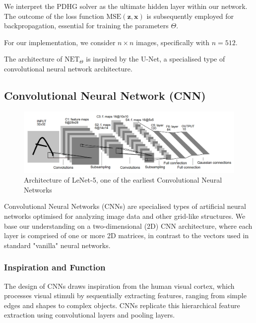\documentclass[12pt]{article}
\begin{document}
We interpret the PDHG solver as the ultimate hidden layer within our network. The outcome of the loss function $\text{MSE}(\mathbf{z}, \mathbf{x})$ is subsequently employed for backpropagation, essential for training the parameters $\Theta$.

For our implementation, we consider $n \times n$ images, specifically with $n = 512$.



The architecture of $\text{NET}_{\Theta}$ is inspired by the U-Net, a specialised type of convolutional neural network architecture.




\subsection{
Convolutional Neural Network (CNN) 
}

\begin{figure}[ht]
    \includegraphics[width=1\linewidth]{Le-Net 5.png}
    
    \caption{Architecture of LeNet-5, one of the earliest Convolutional Neural Networks \cite{726791}} 
    \label{fig:enter-label}
\end{figure}

Convolutional Neural Networks (CNNs) are specialised types of artificial neural networks optimised for analyzing image data and other grid-like structures. We base our understanding on a two-dimensional (2D) CNN architecture, where each layer is comprised of one or more 2D matrices, in contrast to the vectors used in standard "vanilla" neural networks.

\subsubsection*{Inspiration and Function}

The design of CNNs draws inspiration from the human visual cortex, which processes visual stimuli by sequentially extracting features, ranging from simple edges and shapes to complex objects. CNNs replicate this hierarchical feature extraction using convolutional layers and pooling layers. 
\end{document}
